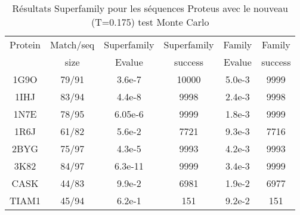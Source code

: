     \begin{table}[h]
           \raggedleft{}

      \begin{tabular}{cccccc}

        \toprule
        Protein & Match/seq & Superfamily & Superfamily & Family & Family \\
                & size      & Evalue      & success     & Evalue & success\\
        \cmidrule{1-6}
        1G9O  & 79/91 & 3.6e-7   &  10000 & 5.0e-3 &  9999  \\
        1IHJ  & 83/94 & 4.4e-8   &   9998 & 2.4e-3 &  9998  \\
        1N7E  & 78/95 & 6.05e-6  &   9999 & 1.8e-3 & 9999   \\
        1R6J  & 61/82 & 5.6e-2   &  7721  & 9.3e-3 &  7716  \\
        2BYG  & 75/97 & 4.3e-5   &  9993  & 4.2e-3 &  9993  \\
        3K82  & 84/97 & 6.3e-11  &  9999  & 3.4e-3 &  9999  \\
        CASK  & 44/83 & 9.9e-2   &  6981  & 1.9e-2 &  6977  \\
        TIAM1 & 45/94 & 6.2e-1   &  151   & 9.2e-2 &  151  \\
        \bottomrule        
      \end{tabular}   
     \caption{Résultats Superfamily pour les séquences Proteus avec le nouveau (T=0.175) test Monte Carlo}   
\label{tab:superfamily_Old_MCtest}       
\end{table}







